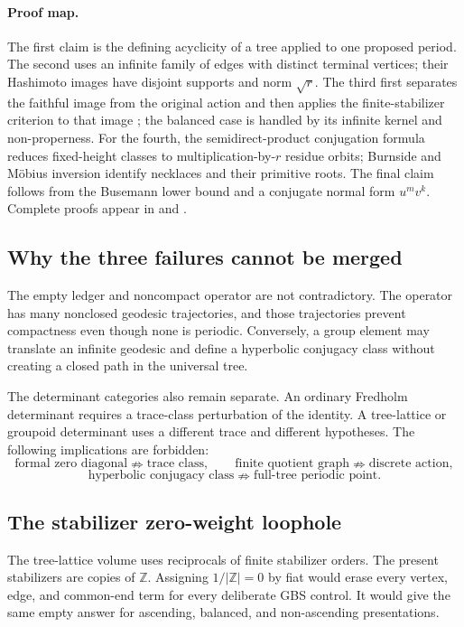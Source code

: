 \paragraph{Proof map.}
The first claim is the defining acyclicity of a tree applied to one proposed
period.  The second uses an infinite family of edges with distinct terminal
vertices; their Hashimoto images have disjoint supports and norm $\sqrt r$.
The third first separates the faithful image from the original action and
then applies the finite-stabilizer criterion to that image
\citep{clair2001zeta}; the balanced case is handled by its infinite kernel
and non-properness.  For the fourth, the
semidirect-product conjugation formula reduces fixed-height classes to
multiplication-by-$r$ residue orbits; Burnside and M\"obius inversion identify
necklaces and their primitive roots.  The final claim follows from the
Busemann lower bound and a conjugate normal form $u^m v^k$.  Complete proofs
appear in  and
.

\subsection{Why the three failures cannot be merged}

The empty ledger and noncompact operator are not contradictory.  The operator
has many nonclosed geodesic trajectories, and those trajectories prevent
compactness even though none is periodic.  Conversely, a group element may
translate an infinite geodesic and define a hyperbolic conjugacy class without
creating a closed path in the universal tree.

The determinant categories also remain separate.  An ordinary Fredholm
determinant requires a trace-class perturbation of the identity.  A tree-lattice
or groupoid determinant uses a different trace and different hypotheses.  The
following implications are forbidden:
\[
  \text{formal zero diagonal}
  \nRightarrow \text{trace class},
  \qquad
  \text{finite quotient graph}
  \nRightarrow \text{discrete action},
\]
\[
  \text{hyperbolic conjugacy class}
  \nRightarrow \text{full-tree periodic point}.
\]

\subsection{The stabilizer zero-weight loophole}

The tree-lattice volume uses reciprocals of finite stabilizer orders.  The
present stabilizers are copies of $\mathbb Z$.  Assigning
$1/|\mathbb Z|=0$ by fiat would erase every vertex, edge, and common-end term
for every deliberate GBS control.  It would give the same empty answer for
ascending, balanced, and non-ascending presentations.

